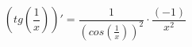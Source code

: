 \documentclass[a4paper,12pt]{article}
\begin{document}
$$( tg ( \frac{1}{x} ) )' =  \frac{1}{( cos ( \frac{1}{x} ) ) ^{2} }  \cdot  \frac{(-1)}{x ^{2} } $$
\end{document}
